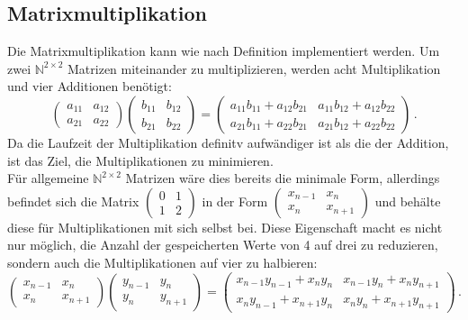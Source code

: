 \documentclass[course=erap]{aspdoc}
\begin{document}
\subsection{Matrixmultiplikation}
Die Matrixmultiplikation kann wie nach Definition implementiert werden. Um zwei $\mathbb{N}^{2\times2}$ Matrizen miteinander zu multiplizieren, werden acht Multiplikation und vier Additionen benötigt:
\[
\left(\begin{matrix}
      a_{11} & a_{12}\\
      a_{21} & a_{22}
      \end{matrix}\right)
\left(\begin{matrix}
      b_{11} & b_{12}\\
      b_{21} & b_{22}
      \end{matrix}\right)
=
\left(\begin{matrix}
      a_{11}b_{11}+a_{12}b_{21} & a_{11}b_{12}+a_{12}b_{22}\\
      a_{21}b_{11}+a_{22}b_{21} & a_{21}b_{12}+a_{22}b_{22}
      \end{matrix}\right) \, .
\]
Da die Laufzeit der Multiplikation definitv aufwändiger ist als die der Addition, ist das Ziel, die Multiplikationen zu minimieren. \\
Für allgemeine $\mathbb{N}^{2\times2}$ Matrizen wäre dies bereits die minimale Form, allerdings befindet sich die Matrix $\left(\begin{matrix}
      0 & 1 \\
      1 & 2
\end{matrix}\right)$ in der Form $\left(\begin{matrix}
      x_{n-1} & x_n \\
      x_n     & x_{n+1}
\end{matrix}\right)$ und behälte diese für Multiplikationen mit sich selbst bei.
Diese Eigenschaft macht es nicht nur möglich, die Anzahl der gespeicherten Werte von 4 auf drei zu reduzieren, sondern auch die Multiplikationen auf vier zu halbieren:
\[
\left(\begin{matrix}
      x_{n-1} & x_n\\
      x_n & x_{n+1}
      \end{matrix}\right)
\left(\begin{matrix}
      y_{n-1} & y_n\\
      y_n & y_{n+1}
      \end{matrix}\right)
=
\left(\begin{matrix}
      x_{n-1}y_{n-1}+x_ny_n & x_{n-1}y_n+x_ny_{n+1}\\
      x_ny_{n-1}+x_{n+1}y_n & x_ny_n+x_{n+1}y_{n+1}
      \end{matrix}\right) \, .
\]
\end{document}
